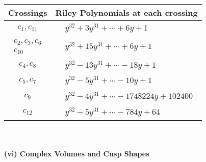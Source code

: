 \documentclass[1p]{elsarticle_modified}
\theoremstyle{definition}
\begin{document}
\begin{tabular}{m{50pt}|m{274pt}}
Crossings & \hspace{64pt}Riley Polynomials at each crossing \\
\hline $$\begin{aligned}c_{1},c_{11}\end{aligned}$$&$\begin{aligned}
&y^{32}+3 y^{31}+\cdots+6 y+1
\end{aligned}$\\
\hline $$\begin{aligned}c_{2},c_{3},c_{6}\\c_{10}\end{aligned}$$&$\begin{aligned}
&y^{32}+15 y^{31}+\cdots+6 y+1
\end{aligned}$\\
\hline $$\begin{aligned}c_{4},c_{8}\end{aligned}$$&$\begin{aligned}
&y^{32}-13 y^{31}+\cdots-18 y+1
\end{aligned}$\\
\hline $$\begin{aligned}c_{5},c_{7}\end{aligned}$$&$\begin{aligned}
&y^{32}-5 y^{31}+\cdots-10 y+1
\end{aligned}$\\
\hline $$\begin{aligned}c_{9}\end{aligned}$$&$\begin{aligned}
&y^{32}-4 y^{31}+\cdots-1748224 y+102400
\end{aligned}$\\
\hline $$\begin{aligned}c_{12}\end{aligned}$$&$\begin{aligned}
&y^{32}-5 y^{31}+\cdots-784 y+64
\end{aligned}$\\
\hline
\end{tabular}\\~\\
\newpage\flushleft \textbf{(vi) Complex Volumes and Cusp Shapes}
\end{document}
